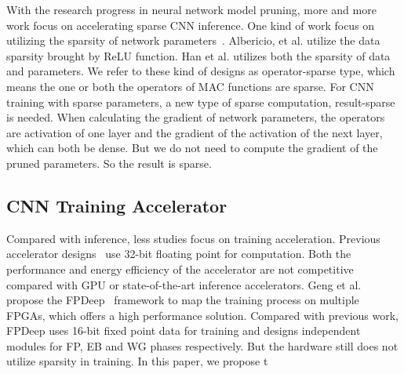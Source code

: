 With the research progress in neural network model pruning, more and more work focus on accelerating sparse CNN inference. One kind of work focus on utilizing the sparsity of network parameters~\cite{han2017ese,zhang2016cambricon}. Albericio, et al.\cite{albericio2016cnvlutin} utilize the data sparsity brought by ReLU function. Han et al. \cite{han2016eie} utilizes both the sparsity of data and parameters. We refer to these kind of designs as operator-sparse type, which means the one or both the operators of MAC functions are sparse. For CNN training with sparse parameters, a new type of sparse computation, result-sparse is needed. When calculating the gradient of network parameters, the operators are activation of one layer and the gradient of the activation of the next layer, which can both be dense. But we do not need to compute the gradient of the pruned parameters. So the result is sparse.

\subsection{CNN Training Accelerator}\label{sec:rw:train_acc}
Compared with inference, less studies focus on training acceleration. Previous accelerator designs~\cite{liu2017fpga, zhao2016f} use 32-bit floating point for computation. Both the performance and energy efficiency of the accelerator are not competitive compared with GPU or state-of-the-art inference accelerators. Geng et al. propose the FPDeep~\cite{geng2018fpdeep} framework to map the training process on multiple FPGAs, which offers a high performance solution. Compared with previous work, FPDeep uses 16-bit fixed point data for training and designs independent modules for FP, EB and WG phases respectively. But the hardware still does not utilize sparsity in training. In this paper, we propose t

